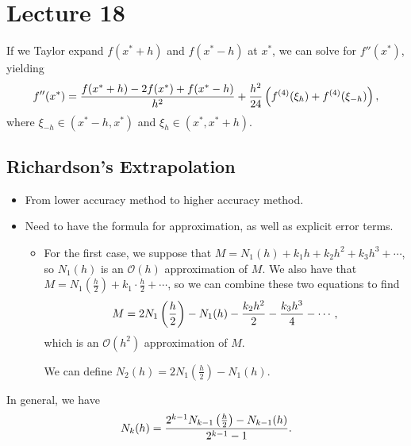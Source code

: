 \documentclass[class=article, crop=false]{standalone}
\begin{document}
  \section{Lecture 18}
  If we Taylor expand $f(x^* + h)$ and $f(x^* - h)$ at $x^*$, we can solve for $f''(x^*)$, yielding
  \[
    f''(x^*) = \frac{f(x^* + h) - 2f(x^*) + f(x^* - h)}{h^2} + \frac{h^2}{24}\left( f^{(4)}(\xi_h) + f^{(4)}(\xi_{-h}) \right),
  \]
  where $\xi_{-h}\in (x^* - h, x^*)$ and $\xi_h\in (x^*, x^* + h)$.
  \subsection{Richardson's Extrapolation}
  \begin{itemize}
    \item From lower accuracy method to higher accuracy method.
    \item Need to have the formula for approximation, as well as explicit error terms.
    \begin{itemize}
      \item For the first case, we suppose that $M = N_1(h) + k_1h + k_2h^2 + k_3h^3 + \dotsb$, so $N_1(h)$ is an $\mathcal{O}(h)$ approximation of $M$. We also have that $M = N_1(\frac{h}{2}) + k_1\cdot \frac{h}{2} + \dotsb$, so we can combine these two equations to find
      \[
        M = 2N_1\left( \frac{h}{2} \right) - N_1(h) - \frac{k_2h^2}{2} - \frac{k_3h^3}{4} - \dotsb,
      \]
      which is an $\mathcal{O}(h^2)$ approximation of $M$.
      \begin{note}{}
        We can define $N_2(h) = 2N_1(\frac{h}{2}) - N_1(h)$.
      \end{note}
    \end{itemize}
  \end{itemize}
  In general, we have
  \[
    N_k(h) = \frac{2^{k - 1}N_{k - 1}\left( \frac{h}{2} \right) - N_{k - 1}(h)}{2^{k - 1} - 1}.
  \]
\end{document}
